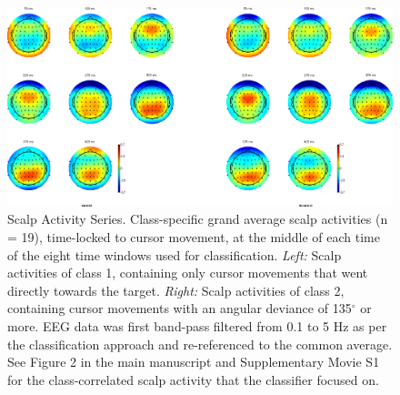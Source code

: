 \begin{figure}[b]
    \renewcommand\thefigure{\ref{chapter:nat}.S8}
    \centering
    \includegraphics[width=\textwidth]{figures/nat-app-fig-s8.png}
    \caption[Scalp activity series time-locked to cursor movements.]{Scalp Activity Series. Class-specific grand average scalp activities (n = 19), time-locked to cursor movement, at the middle of each time of the eight time windows used for classification. \textit{Left:} Scalp activities of class 1, containing only cursor movements that went directly towards the target. \textit{Right:} Scalp activities of class 2, containing cursor movements with an angular deviance of 135$^\circ$ or more. EEG data was first band-pass filtered from 0.1 to 5 Hz as per the classification approach and re-referenced to the common average. See Figure 2 in the main manuscript and Supplementary Movie S1 for the class-correlated scalp activity that the classifier focused on.}
\end{figure}

